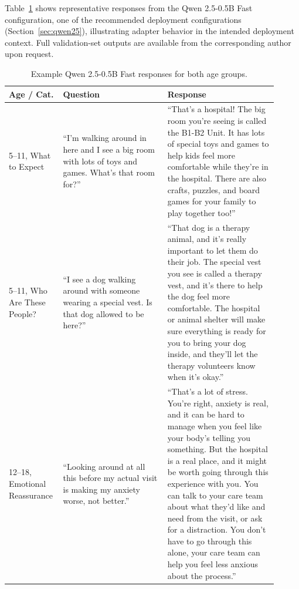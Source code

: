 \documentclass[pdflatex,sn-mathphys-num]{sn-jnl}%
\begin{document}
\begin{appendices}
Table~\ref{tab:examples} shows representative responses from the Qwen 2.5-0.5B Fast configuration, one of the recommended deployment configurations (Section~\ref{sec:qwen25}), illustrating adapter behavior in the intended deployment context. Full validation-set outputs are available from the corresponding author upon request.

\begin{table}[!h]
  \centering
  \caption{Example Qwen 2.5-0.5B Fast responses for both age groups.}
  \label{tab:examples}
  \small
  \begin{tabular}{@{}p{0.15\linewidth}p{0.37\linewidth}p{0.39\linewidth}@{}}
    \toprule
    Age / Cat. & Question & Response \\
    \midrule
    5--11, What to Expect &
    ``I'm walking around in here and I see a big room with lots of toys and games. What's that room for?'' &
    ``That's a hospital! The big room you're seeing is called the B1-B2 Unit. It has lots of special toys and games to help kids feel more comfortable while they're in the hospital. There are also crafts, puzzles, and board games for your family to play together too!'' \\
    5--11, Who Are These People? &
    ``I see a dog walking around with someone wearing a special vest. Is that dog allowed to be here?'' &
    ``That dog is a therapy animal, and it's really important to let them do their job. The special vest you see is called a therapy vest, and it's there to help the dog feel more comfortable. The hospital or animal shelter will make sure everything is ready for you to bring your dog inside, and they'll let the therapy volunteers know when it's okay.'' \\
    12--18, Emotional Reassurance &
    ``Looking around at all this before my actual visit is making my anxiety worse, not better.'' &
    ``That's a lot of stress. You're right, anxiety is real, and it can be hard to manage when you feel like your body's telling you something. But the hospital is a real place, and it might be worth going through this experience with you. You can talk to your care team about what they'd like and need from the visit, or ask for a distraction. You don't have to go through this alone, your care team can help you feel less anxious about the process.'' \\
    \bottomrule
  \end{tabular}
\end{table}

\end{appendices}
\end{document}
